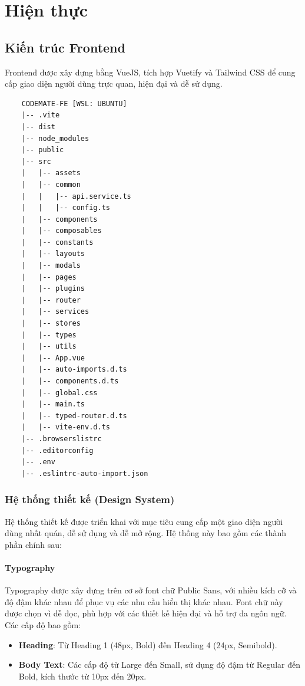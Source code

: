 \chapter{Hiện thực}

\section{Kiến trúc Frontend}

Frontend được xây dựng bằng VueJS, tích hợp Vuetify và Tailwind CSS để cung cấp giao diện người dùng trực quan, hiện đại và dễ sử dụng.

\begin{verbatim}
    CODEMATE-FE [WSL: UBUNTU]
    |-- .vite
    |-- dist
    |-- node_modules
    |-- public
    |-- src
    |   |-- assets
    |   |-- common
    |   |   |-- api.service.ts
    |   |   |-- config.ts
    |   |-- components
    |   |-- composables
    |   |-- constants
    |   |-- layouts
    |   |-- modals
    |   |-- pages
    |   |-- plugins
    |   |-- router
    |   |-- services
    |   |-- stores
    |   |-- types
    |   |-- utils
    |   |-- App.vue
    |   |-- auto-imports.d.ts
    |   |-- components.d.ts
    |   |-- global.css
    |   |-- main.ts
    |   |-- typed-router.d.ts
    |   |-- vite-env.d.ts
    |-- .browserslistrc
    |-- .editorconfig
    |-- .env
    |-- .eslintrc-auto-import.json
    \end{verbatim}

\subsection*{Hệ thống thiết kế (Design System)}

Hệ thống thiết kế được triển khai với mục tiêu cung cấp một giao diện người dùng nhất quán, dễ sử dụng và dễ mở rộng. Hệ thống này bao gồm các thành phần chính sau:

\subsubsection*{Typography}
Typography được xây dựng trên cơ sở font chữ Public Sans, với nhiều kích cỡ và độ đậm khác nhau để phục vụ các nhu cầu hiển thị khác nhau. Font chữ này được chọn vì dễ đọc, phù hợp với các thiết kế hiện đại và hỗ trợ đa ngôn ngữ. Các cấp độ bao gồm:

\begin{itemize}
    \item \textbf{Heading}: Từ Heading 1 (48px, Bold) đến Heading 4 (24px, Semibold).
    \item \textbf{Body Text}: Các cấp độ từ Large đến Small, sử dụng độ đậm từ Regular đến Bold, kích thước từ 10px đến 20px.
\end{itemize}

